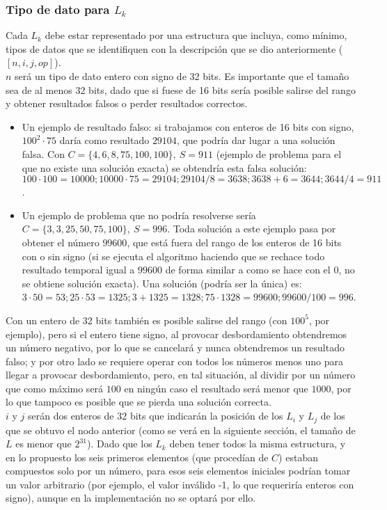 \subsubsection{Tipo de dato para $L_k$}

Cada $L_k$ debe estar representado por una estructura que incluya, como
mínimo, tipos de datos que se identifiquen con la descripción que se dio
anteriormente ($[n, i, j, op]$).\\

$n$ será un tipo de dato entero con signo de 32 bits. Es importante
que el tamaño sea de al menos 32 bits, dado que si fuese de 16 bits sería posible
salirse del rango y obtener resultados falsos o perder resultados correctos.
\begin{itemize}
	\item Un ejemplo de resultado falso: si trabajamos con enteros de 16 bits con
	signo, $100^2 \cdot 75$ daría como resultado $29104$, que podría dar lugar a
	una solución falsa. Con $C=\{4, 6, 8, 75, 100, 100\},\ S = 911$ (ejemplo de
	problema para el que no existe una solución exacta) se obtendría esta falsa
	solución: $100 \cdot 100=10000; 10000 \cdot 75=29104;29104/8=3638;3638+6=3644;3644/4=911$.
	\item Un ejemplo de problema que no podría resolverse sería
	$C=\{3, 3, 25, 50, 75, 100\},\ S = 996$. Toda solución a este ejemplo pasa por
	obtener el número $99600$, que está fuera del rango de los enteros de 16 bits
	con o sin signo (si se ejecuta el algoritmo haciendo que se rechace todo
	resultado temporal igual a $99600$ de forma similar a como se hace con el
	$0$, no se obtiene solución exacta). Una solución (podría ser la única) es:
	$3 \cdot 50 = 53; 25 \cdot 53 = 1325; 3+1325=1328; 75 \cdot 1328 = 99600; 99600/100=996$.
\end{itemize}

Con un entero de 32 bits también es posible salirse del rango (con $100^5$, por ejemplo), pero si el entero tiene signo, al provocar desbordamiento obtendremos un número negativo, por lo que se cancelará y nunca obtendremos un resultado falso; y por otro lado se requiere operar con todos los números menos uno para llegar a provocar desbordamiento, pero, en tal situación, al dividir por un número que como máximo será $100$ en ningún caso el resultado será menor que $1000$, por lo que tampoco es posible que se pierda una solución correcta.\\

$i$ y $j$ serán dos enteros de 32 bits que indicarán la posición de los $L_i$
y $L_j$ de los que se obtuvo el nodo anterior (como se verá en la siguiente sección, el tamaño de $L$ es menor que $2^{31}$). Dado que los $L_k$ deben tener
todos la misma estructura, y en lo propuesto los seis primeros elementos (que
procedían de $C$) estaban compuestos solo por un número, para esos seis
elementos iniciales podrían tomar un valor arbitrario (por ejemplo, el valor
inválido -1, lo que requeriría enteros con signo), aunque en la
implementación no se optará por ello. \\

